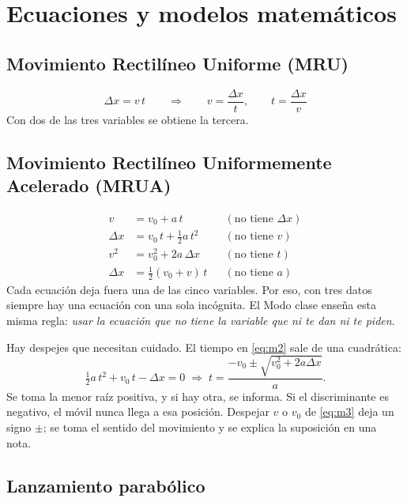 \documentclass[11pt,letterpaper]{article}
\begin{document}
\section{Ecuaciones y modelos matemáticos}

\subsection{Movimiento Rectilíneo Uniforme (MRU)}

\begin{equation}
  \Delta x = v\,t \qquad\Longrightarrow\qquad v = \frac{\Delta x}{t}, \qquad t = \frac{\Delta x}{v}
\end{equation}
Con dos de las tres variables se obtiene la tercera.

\subsection{Movimiento Rectilíneo Uniformemente Acelerado (MRUA)}

\begin{align}
  v &= v_0 + a\,t & &(\text{no tiene } \Delta x) \label{eq:m1}\\
  \Delta x &= v_0\,t + \tfrac12 a\,t^2 & &(\text{no tiene } v) \label{eq:m2}\\
  v^2 &= v_0^2 + 2a\,\Delta x & &(\text{no tiene } t) \label{eq:m3}\\
  \Delta x &= \tfrac12 (v_0 + v)\,t & &(\text{no tiene } a) \label{eq:m4}
\end{align}
Cada ecuación deja fuera una de las cinco variables. Por eso, con tres datos siempre hay una ecuación con una sola incógnita. El Modo clase enseña esta misma regla: \emph{usar la ecuación que no tiene la variable que ni te dan ni te piden}.

Hay despejes que necesitan cuidado. El tiempo en \eqref{eq:m2} sale de una cuadrática:
\[
  \tfrac12 a\,t^2 + v_0\,t - \Delta x = 0 \;\Rightarrow\; t = \frac{-v_0 \pm \sqrt{v_0^2 + 2a\Delta x}}{a}.
\]
Se toma la menor raíz positiva, y si hay otra, se informa. Si el discriminante es negativo, el móvil nunca llega a esa posición. Despejar $v$ o $v_0$ de \eqref{eq:m3} deja un signo $\pm$; se toma el sentido del movimiento y se explica la suposición en una nota.

\subsection{Lanzamiento parabólico}
\end{document}
